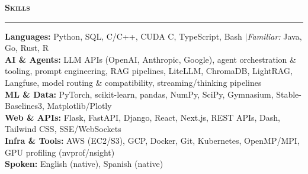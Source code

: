\documentclass[letterpaper,10.5pt]{article}
\renewcommand{\section}[1]{%
  \vspace{0.5em}%
  {\normalsize\bfseries\scshape #1}%
  \vspace{-0.5em}%
  \par\noindent\rule{\textwidth}{0.4pt}%
  \vspace{0.15em}%
}
\begin{document}
\section{Skills}

{\small
\textbf{Languages:} Python, SQL, C/C++, CUDA C, TypeScript, Bash \enspace$\vert$\enspace \textit{Familiar:} Java, Go, Rust, R \\
\textbf{AI \& Agents:} LLM APIs (OpenAI, Anthropic, Google), agent orchestration \& tooling, prompt engineering, RAG pipelines, LiteLLM, ChromaDB, LightRAG, Langfuse, model routing \& compatibility, streaming/thinking pipelines \\
\textbf{ML \& Data:} PyTorch, scikit-learn, pandas, NumPy, SciPy, Gymnasium, Stable-Baselines3, Matplotlib/Plotly \\
\textbf{Web \& APIs:} Flask, FastAPI, Django, React, Next.js, REST APIs, Dash, Tailwind CSS, SSE/WebSockets \\
\textbf{Infra \& Tools:} AWS (EC2/S3), GCP, Docker, Git, Kubernetes, OpenMP/MPI, GPU profiling (nvprof/nsight) \\
\textbf{Spoken:} English (native), Spanish (native)
}
\end{document}
